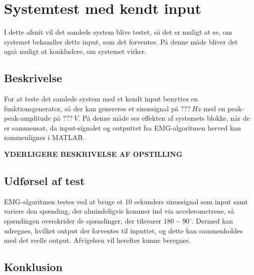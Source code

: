 \section{Systemtest med kendt input}
I dette afsnit vil det samlede system blive testet, så det er muligt at se, om systemet behandler dette input, som det forventes. På denne måde bliver det også muligt at konkludere, om systemet virker. 

\subsection{Beskrivelse}
For at teste det samlede system med et kendt input benyttes en funktionsgenerator, så der kan genereres et sinussignal på $???~Hz$ med en peak-peak-amplitude på $???~V$. På denne måde ses effekten af systemets blokke, når de er sammensat, da input-signalet og outputtet fra EMG-algoritmen herved kan sammenlignes i MATLAB.

\textbf{YDERLIGERE BESKRIVELSE AF OPSTILLING}
 
\subsection{Udførsel af test}

EMG-algoritmen testes ved at bruge et 10 sekunders sinussignal som input samt variere den spænding, der almindeligvis kommer ind via accelerometrene, så spændingen overskrider de spændinger, der tilsvarer $180-90^{\circ}$. 
Dermed kan udregnes, hvilket output der forventes til inputtet, og dette kan sammenholdes med det reelle output. Afvigelsen vil herefter kunne beregnes. 

\subsection{Konklusion}
